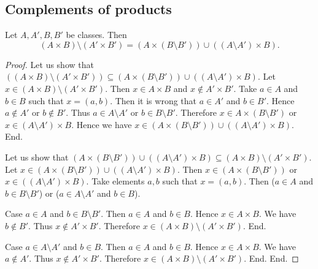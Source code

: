 \documentclass[../../set-theory/set-theory.tex]{subfiles}
\begin{document}
  \subsection*{Complements of products}

  \begin{forthel}
    \begin{proposition}
      Let $A, A', B, B'$ be classes.
      Then \[ (A \times B) \setminus (A' \times B') =
      (A \times (B \setminus B')) \cup ((A \setminus A') \times B). \]
    \end{proposition}
    \begin{proof}
      Let us show that $((A \times B) \setminus (A' \times B')) \subseteq
      (A \times (B \setminus B')) \cup ((A \setminus A') \times B)$.
        Let $x \in (A \times B) \setminus (A' \times B')$.
        Then $x \in A \times B$ and $x \notin A' \times B'$.
        Take $a \in A$ and $b \in B$ such that $x = (a, b)$.
        Then it is wrong that $a \in A'$ and $b \in B'$.
        Hence $a \notin A'$ or $b \notin B'$.
        Thus $a \in A \setminus A'$ or $b \in B \setminus B'$.
        Therefore $x \in A \times (B \setminus B')$ or
        $x \in (A \setminus A') \times B$.
        Hence we have $x \in (A \times (B \setminus B')) \cup
        ((A \setminus A') \times B)$.
      End.

      Let us show that $(A \times (B \setminus B')) \cup ((A \setminus A') \times B)
      \subseteq (A \times B) \setminus (A' \times B')$.
        Let $x \in (A \times (B \setminus B')) \cup
        ((A \setminus A') \times B)$.
        Then $x \in (A \times (B \setminus B'))$ or
        $x \in ((A \setminus A') \times B)$.
        Take elements $a,b$ such that $x = (a, b)$.
        Then ($a \in A$ and $b \in B \setminus B'$) or
        ($a \in A \setminus A'$ and $b \in B$).

        Case $a \in A$ and $b \in B \setminus B'$.
          Then $a \in A$ and $b \in B$.
          Hence $x \in A \times B$.
          We have $b \notin B'$.
          Thus $x \notin A' \times B'$.
          Therefore $x \in (A \times B) \setminus (A' \times B')$.
        End.

        Case $a \in A \setminus A'$ and $b \in B$.
          Then $a \in A$ and $b \in B$.
          Hence $x \in A \times B$.
          We have $a \notin A'$.
          Thus $x \notin A' \times B'$.
          Therefore $x \in (A \times B) \setminus (A' \times B')$.
        End.
      End.
    \end{proof}
  \end{forthel}
\end{document}
